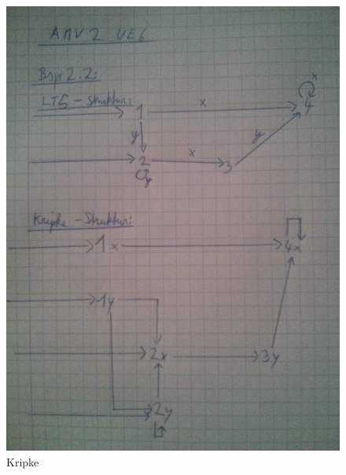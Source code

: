 \documentclass[12pt,a4paper]{article}
\begin{document}
\begin{figure}[ht!]
\centering
\includegraphics[width=\textwidth]{2.jpg}
\caption{Kripke}
\end{figure}
\end{document}
